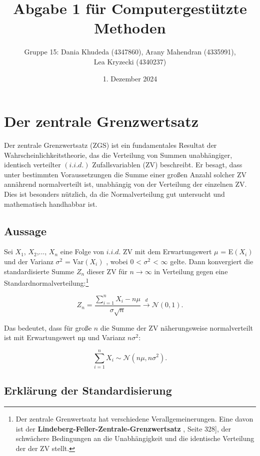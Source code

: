 \documentclass{article}
\title{Abgabe 1 für Computergestützte Methoden}
\author{Gruppe 15: Dania Khudeda (4347860), Arany Mahendran (4335991), \\
Lea Kryzecki (4340237)}
\date{1. Dezember 2024}
\begin{document}
\maketitle 
\tableofcontents
\newpage
\section{Der zentrale Grenzwertsatz}

Der zentrale Grenzwertsatz (ZGS) ist ein fundamentales Resultat der Wahrscheinlichkeitstheorie, das die Verteilung von Summen unabhängiger, identisch verteilter $(i.i.d.)$ Zufallsvariablen (ZV) beschreibt. 
Er besagt, dass unter bestimmten Voraussetzungen die Summe einer großen Anzahl solcher ZV annährend normalverteilt ist, unabhängig von der Verteilung der einzelnen ZV. Dies ist besonders nützlich, da die Normalverteilung gut untersucht und mathematisch handhabbar ist.

\subsection{Aussage}

Sei $X_1$, $X_2$,..., $X_n$ eine Folge von $i.i.d.$ ZV mit dem Erwartungswert $\mu$ = E$(X_i)$ und der Varianz $\sigma^2$ = Var$(X_i)$ , wobei 0 < $\sigma^2$ < $\infty$ gelte. Dann konvergiert die standardisierte Summe $Z_n$ dieser ZV für ${n \to \infty}$ in Verteilung gegen eine Standardnormalverteilung:\footnote[1]{Der zentrale Grenwertsatz hat verschiedene Verallgemeinerungen. Eine davon ist der \textbf{Lindeberg-Feller-Zentrale-Grenzwertsatz} \cite{buch}, Seite 328], der schwächere Bedingungen an die Unabhängigkeit und die identische Verteilung der der ZV stellt.}

 \begin{equation}
 \label{eq: sum}
     Z_n = \frac{\sum_{i=1}^{n} X_i - n\mu}  {\sigma\sqrt{n}}\overset{d}\to \mathcal{N}(0,1). 
 \end{equation}


Das bedeutet, dass für große $n$ die Summe der ZV näherungsweise normalverteilt ist mit Erwartungswert nµ und Varianz $n\sigma^2$: 

\begin{equation}
    \label{eq: sum1}
 \sum_{i=1}^{n} X_i \sim\mathcal{N}(n\mu, n\sigma^2).
\end{equation}

\subsection{Erklärung der Standardisierung}
\end{document}
